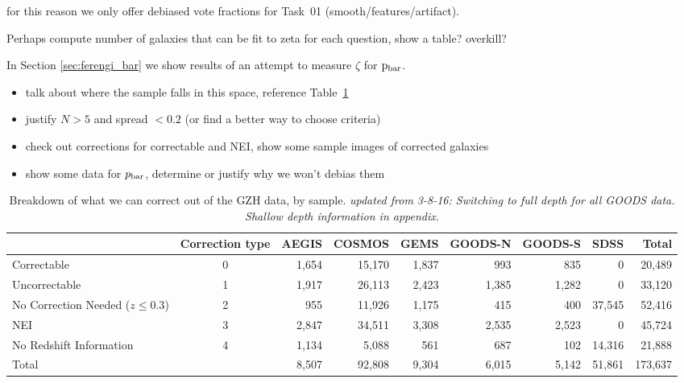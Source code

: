 \documentclass[twocolumn]{aastex6}
\begin{document}
for this reason we only offer debiased vote fractions for Task~01 (smooth/features/artifact). 

{\note Perhaps compute number of galaxies that can be fit to zeta for each question, show a table? overkill?} 

In Section \ref{sec:ferengi_bar} we show results of an attempt to measure $\zeta$ for $\rm p_{bar}$. 

{\note
\begin{itemize}
\item talk about where the \hst{} sample falls in this space, reference Table~\ref{tbl:hubble_debiasable} 
\item justify $N>5$ and spread $< 0.2$ (or find a better way to choose criteria)
\item check out corrections for correctable and NEI, show some sample images of corrected galaxies
\item show some data for $p_{\rm bar}$, determine or justify why we won't debias them  
\end{itemize}
}

 
\begin{table}
\caption{Breakdown of what we can correct out of the GZH data, by sample.  \emph{updated from 3-8-16: Switching to full depth for all GOODS data. Shallow depth information in appendix.}\label{tbl:hubble_debiasable}}
\begin{tabular}{lcrrrrrrr}
\hline\hline
                                   & Correction type & AEGIS   & COSMOS & GEMS & GOODS-N & GOODS-S    & SDSS    & Total \\
\hline
Correctable                        & 0               & 1,654   & 15,170 & 1,837 & 993    & 835     	& 0       & 20,489\\
Uncorrectable                      & 1               & 1,917   & 26,113 & 2,423 & 1,385  & 1,282   	& 0       & 33,120\\
No Correction Needed ($z \le 0.3$) & 2               & 955     & 11,926 & 1,175 & 415    & 400     	& 37,545  & 52,416\\ 
NEI                                & 3               & 2,847   & 34,511 & 3,308 & 2,535  & 2,523   	& 0       & 45,724\\
No Redshift Information            & 4               & 1,134   & 5,088  & 561   & 687    & 102   		& 14,316  & 21,888\\
Total                              &                 & 8,507   & 92,808 & 9,304 & 6,015  & 5,142   	& 51,861  & 173,637\\
\hline\hline
\end{tabular}
\end{table}
\end{document}
